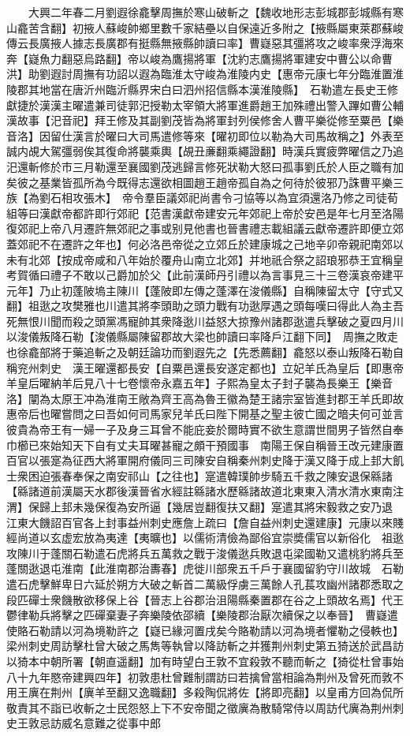 　　大興二年春二月劉遐徐龕擊周撫於寒山破斬之【魏收地形志彭城郡彭城縣有寒山龕苦含翻】初掖人蘇峻帥鄉里數千家結壘以自保遠近多附之【掖縣屬東萊郡蘇峻傳云長廣掖人據志長廣郡有挺縣無掖縣帥讀曰率】曹嶷惡其彊將攻之峻率衆浮海來奔【嶷魚力翻惡烏路翻】帝以峻為鷹揚將軍【沈約志鷹揚將軍建安中曹公以命曹洪】助劉遐討周撫有功詔以遐為臨淮太守峻為淮陵内史【惠帝元康七年分臨淮置淮陵郡其地當在唐沂州臨沂縣界宋白曰泗州招信縣本漢淮陵縣】　石勒遣左長史王修獻捷於漢漢主曜遣兼司徒郭汜授勒太宰領大將軍進爵趙王加殊禮出警入蹕如曹公輔漢故事【汜音祀】拜王修及其副劉茂皆為將軍封列侯修舍人曹平樂從修至粟邑【樂音洛】因留仕漢言於曜曰大司馬遣修等來【曜初即位以勒為大司馬故稱之】外表至誠内覘大駕彊弱俟其復命將襲乘輿【覘丑亷翻乘繩證翻】時漢兵實疲弊曜信之乃追汜還斬修於市三月勒還至襄國劉茂逃歸言修死狀勒大怒曰孤事劉氏於人臣之職有加矣彼之基業皆孤所為今既得志還欲相圖趙王趙帝孤自為之何待於彼邪乃誅曹平樂三族【為劉石相攻張木】　帝令羣臣議郊祀尚書令刁協等以為宜須還洛乃修之司徒荀組等曰漢獻帝都許即行郊祀【范書漢獻帝建安元年郊祀上帝於安邑是年七月至洛陽復郊祀上帝八月遷許無郊祀之事或别見他書也晉書禮志載組議云獻帝遷許即便立郊蓋郊祀不在遷許之年也】何必洛邑帝從之立郊丘於建康城之己地辛卯帝親祀南郊以未有北郊【按成帝咸和八年始於覆舟山南立北郊】并地祇合祭之詔琅邪恭王宜稱皇考賀循曰禮子不敢以己爵加於父【此前漢師丹引禮以為言事見三十三卷漢哀帝建平元年】乃止初蓬陂塢主陳川【蓬陂即左傳之蓬澤在浚儀縣】自稱陳留太守【守式又翻】祖逖之攻樊雅也川遣其將李頭助之頭力戰有功逖厚遇之頭每嘆曰得此人為主吾死無恨川聞而殺之頭黨馮寵帥其衆降逖川益怒大掠豫州諸郡逖遣兵擊破之夏四月川以浚儀叛降石勒【浚儀縣屬陳留郡故大梁也帥讀曰率降戶江翻下同】　周撫之敗走也徐龕部將于藥追斬之及朝廷論功而劉遐先之【先悉薦翻】龕怒以泰山叛降石勒自稱兖州刺史　漢王曜還都長安【自粟邑還長安遂定都也】立妃羊氏為皇后【即惠帝羊皇后曜納羊后見八十七卷懷帝永嘉五年】子熙為皇太子封子襲為長樂王【樂音洛】闡為太原王冲為淮南王敞為齊王高為魯王徽為楚王諸宗室皆進封郡王羊氏即故惠帝后也曜嘗問之曰吾如何司馬家兒羊氏曰陛下開基之聖主彼亡國之暗夫何可並言彼貴為帝王有一婦一子及身三耳曾不能庇妾於爾時實不欲生意謂世間男子皆然自奉巾櫛已來始知天下自有丈夫耳曜甚寵之頗干預國事　南陽王保自稱晉王改元建康置百官以張寔為征西大將軍開府儀同三司陳安自稱秦州刺史降于漢又降于成上邽大飢士衆困迫張春奉保之南安祁山【之往也】寔遣韓璞帥步騎五千救之陳安退保緜諸【緜諸道前漢屬天水郡後漢晉省水經註緜諸水歷緜諸故道北東東入清水清水東南注渭】保歸上邽未幾保復為安所逼【幾居豈翻復扶又翻】寔遣其將宋毅救之安乃退　江東大饑詔百官各上封事益州刺史應詹上疏曰【詹自益州刺史還建康】元康以來賤經尚道以玄虚宏放為夷達【夷曠也】以儒術清儉為鄙俗宜崇奬儒官以新俗化　祖逖攻陳川于蓬關石勒遣石虎將兵五萬救之戰于浚儀逖兵敗退屯梁國勒又遣桃豹將兵至蓬關逖退屯淮南【此淮南郡治夀春】虎徙川部衆五千戶于襄國留豹守川故城　石勒遣石虎擊鮮卑日六延於朔方大破之斬首二萬級俘虜三萬餘人孔萇攻幽州諸郡悉取之段匹磾士衆饑散欲移保上谷【晉志上谷郡治沮陽縣秦置郡在谷之上頭故名焉】代王鬱律勒兵將擊之匹磾棄妻子奔樂陵依邵續【樂陵郡治厭次續保之以奉晉】　曹嶷遣使賂石勒請以河為境勒許之【嶷已緣河置戌矣今賂勒請以河為境者懼勒之侵軼也】　梁州刺史周訪擊杜曾大破之馬雋等執曾以降訪斬之并獲荆州刺史第五猗送於武昌訪以猗本中朝所署【朝直遥翻】加有時望白王敦不宜殺敦不聽而斬之【猗從杜曾事始八十九年愍帝建興四年】初敦患杜曾難制謂訪曰若擒曾當相論為荆州及曾死而敦不用王廙在荆州【廙羊至翻又逸職翻】多殺陶侃將佐【將即亮翻】以皇甫方回為侃所敬責其不詣已收斬之士民怨怒上下不安帝聞之徵廙為散騎常侍以周訪代廙為荆州刺史王敦忌訪威名意難之從事中郎